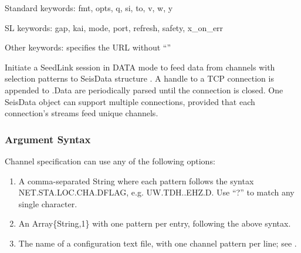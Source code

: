 \documentclass[letterpaper,11pt,english]{sphinxmanual}
\begin{document}
\begin{fulllineitems}
\end{fulllineitems}


\begin{DUlineblock}{0em}
\item[] Standard keywords: fmt, opts, q, si, to, v, w, y
\item[] SL keywords: gap, kai, mode, port, refresh, safety, x\_on\_err
\item[] Other keywords:  specifies the URL without “”
\end{DUlineblock}

Initiate a SeedLink session in DATA mode to feed data from channels  with
selection patterns  to SeisData structure . A handle to a TCP
connection is appended to .Data are periodically parsed until the
connection is closed. One SeisData object can support multiple connections,
provided that each connection’s streams feed unique channels.


\subsubsection{Argument Syntax}
\label{\detokenize{src/Web/seedlink:argument-syntax}}

Channel specification can use any of the following options:
\begin{enumerate}
\def\theenumi{\arabic{enumi}}
\def\labelenumi{\theenumi .}
\makeatletter\def\p@enumii{\p@enumi \theenumi .}\makeatother
\item {} 
A comma-separated String where each pattern follows the syntax NET.STA.LOC.CHA.DFLAG, e.g. UW.TDH..EHZ.D. Use “?” to match any single character.

\item {} 
An Array\{String,1\} with one pattern per entry, following the above syntax.

\item {} 
The name of a configuration text file, with one channel pattern per line; see {\hyperref[\detokenize{src/Appendices/web_syntax:ccfg}]{}}.

\end{enumerate}
\end{document}

